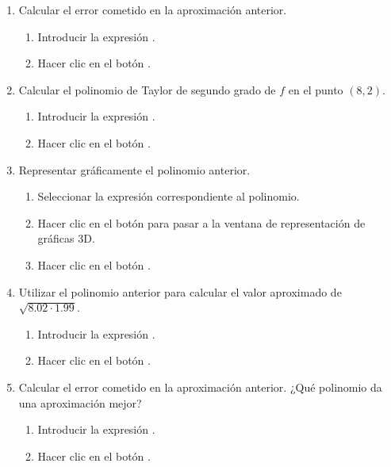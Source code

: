 \begin{enumerate}[leftmargin=*]
\begin{enumerate}
\item Calcular el error cometido en la aproximación anterior.
\begin{indicacion}
\begin{enumerate}
\item Introducir la expresión .
\item Hacer clic en el botón .
\end{enumerate}
\end{indicacion}

\item Calcular el polinomio de Taylor de segundo grado de $f$ en el punto $(8,2)$.
\begin{indicacion}
\begin{enumerate}
\item Introducir la expresión .
\item Hacer clic en el botón .
\end{enumerate}
\end{indicacion}

\item Representar gráficamente el polinomio anterior.
\begin{indicacion}
\begin{enumerate}
\item Seleccionar la expresión correspondiente al polinomio. 
\item Hacer clic en el botón  para pasar a la ventana de representación de gráficas 3D.
\item Hacer clic en el botón .
\end{enumerate}
\end{indicacion}

\item Utilizar el polinomio anterior para calcular el valor aproximado de $\sqrt{8.02\cdot 1.99}$.
\begin{indicacion}
\begin{enumerate}
\item Introducir la expresión .
\item Hacer clic en el botón .
\end{enumerate}
\end{indicacion}

\item Calcular el error cometido en la aproximación anterior. ¿Qué polinomio da una aproximación mejor?
\begin{indicacion}
\begin{enumerate}
\item Introducir la expresión .
\item Hacer clic en el botón .
\end{enumerate}
\end{indicacion}
\end{enumerate}
\end{enumerate}


